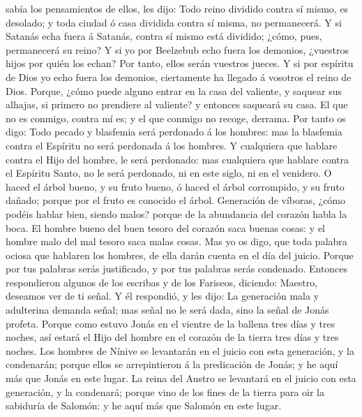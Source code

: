 sabía los pensamientos de ellos, les dijo: Todo reino dividido contra sí
mismo, es desolado; y toda ciudad ó casa dividida contra sí misma, no
permanecerá.  Y si Satanás echa fuera á Satanás, contra
sí mismo está dividido; ¿cómo, pues, permanecerá su reino?
 Y si yo por Beelzebub echo fuera los demonios, ¿vuestros
hijos por quién los echan? Por tanto, ellos serán vuestros jueces.
 Y si por espíritu de Dios yo echo fuera los demonios,
ciertamente ha llegado á vosotros el reino de Dios. 
Porque, ¿cómo puede alguno entrar en la casa del valiente, y saquear sus
alhajas, si primero no prendiere al valiente? y entonces saqueará su
casa.  El que no es conmigo, contra mí es; y el que
conmigo no recoge, derrama.  Por tanto os digo: Todo
pecado y blasfemia será perdonado á los hombres: mas la blasfemia contra
el Espíritu no será perdonada á los hombres.  Y
cualquiera que hablare contra el Hijo del hombre, le será perdonado: mas
cualquiera que hablare contra el Espíritu Santo, no le será perdonado,
ni en este siglo, ni en el venidero.  O haced el árbol
bueno, y su fruto bueno, ó haced el árbol corrompido, y su fruto dañado;
porque por el fruto es conocido el árbol.  Generación de
víboras, ¿cómo podéis hablar bien, siendo malos? porque de la abundancia
del corazón habla la boca.  El hombre bueno del buen
tesoro del corazón saca buenas cosas: y el hombre malo del mal tesoro
saca malas cosas.  Mas yo os digo, que toda palabra
ociosa que hablaren los hombres, de ella darán cuenta en el día del
juicio.  Porque por tus palabras serás justificado, y por
tus palabras serás condenado.  Entonces respondieron
algunos de los escribas y de los Fariseos, diciendo: Maestro, deseamos
ver de ti señal.  Y él respondió, y les dijo: La
generación mala y adulterina demanda señal; mas señal no le será dada,
sino la señal de Jonás profeta.  Porque como estuvo Jonás
en el vientre de la ballena tres días y tres noches, así estará el Hijo
del hombre en el corazón de la tierra tres días y tres noches.
 Los hombres de Nínive se levantarán en el juicio con
esta generación, y la condenarán; porque ellos se arrepintieron á la
predicación de Jonás; y he aquí más que Jonás en este lugar.
 La reina del Austro se levantará en el juicio con esta
generación, y la condenará; porque vino de los fines de la tierra para
oir la sabiduría de Salomón: y he aquí más que Salomón en este lugar.
